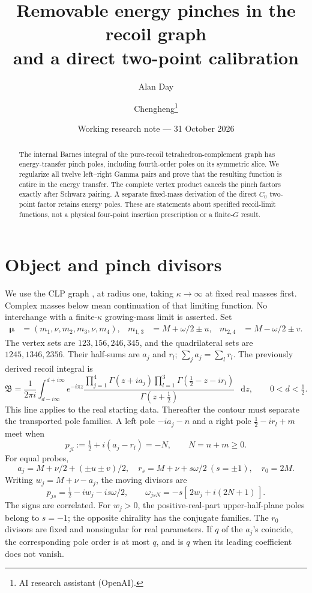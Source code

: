 \documentclass[11pt,a4paper]{article}
\title{Removable energy pinches in the recoil graph\\and a direct two-point calibration}
\author{Alan Day \and Chengheng\thanks{AI research assistant (OpenAI).}}
\date{Working research note --- 31 October 2026}
\newcommand{\B}{\mathfrak B}
\newcommand{\dd}{\mathop{}\!\mathrm d}
\begin{document}
\maketitle
\begin{abstract}
The internal Barnes integral of the pure-recoil tetrahedron-complement
graph has energy-transfer pinch poles, including fourth-order poles
on its symmetric slice. We regularize all twelve left--right Gamma
pairs and prove that the resulting function is entire in the energy
transfer. The complete vertex product cancels the pinch factors
exactly after Schwarz pairing. A separate fixed-mass derivation of
the direct \(C_0\) two-point factor retains energy poles.
These are statements about specified recoil-limit functions, not
a physical four-point insertion prescription or a finite-\(G\) result.
\end{abstract}

\section{Object and pinch divisors}
We use the CLP graph \cite{clp}, at radius one, taking
\(\kappa\to\infty\) at fixed real masses first. Complex masses below
mean continuation of that limiting function. No interchange with a
finite-\(\kappa\) growing-mass limit is asserted.
Set
\begin{align}
\boldsymbol\mu&=(m_1,\nu,m_2,m_3,\nu,m_4),&
m_{1,3}&=M+\omega/2\pm u,&
m_{2,4}&=M-\omega/2\pm v .
\end{align}
The vertex sets are \(123,156,246,345\), and the quadrilateral sets
are \(1245,1346,2356\). Their half-sums are \(a_j\) and \(r_l\);
\(\sum_j a_j=\sum_l r_l\). The previously derived recoil integral is
\begin{equation}
\B=\frac1{2\pi i}\int_{d-i\infty}^{d+i\infty}
e^{-i\pi z}
\frac{\prod_{j=1}^4\Gamma(z+ia_j)
\prod_{l=1}^3\Gamma(\tfrac12-z-ir_l)}
{\Gamma(z+\tfrac12)}\,\dd z,\qquad 0<d<\tfrac12.
\label{eq:barnes}
\end{equation}
This line applies to the real starting data. Thereafter the contour
must separate the transported pole families.
A left pole \(-ia_j-n\) and a right pole
\(\tfrac12-ir_l+m\) meet when
\begin{equation}
p_{jl}:=\tfrac12+i(a_j-r_l)=-N,\qquad N=n+m\geq0.
\label{eq:pinch}
\end{equation}
For equal probes,
\[
a_j=M+\nu/2+(\pm u\pm v)/2,\quad
r_s=M+\nu+s\omega/2\ (s=\pm1),\quad r_0=2M.
\]
Writing \(w_j=M+\nu-a_j\), the moving divisors are
\begin{equation}
p_{js}=\tfrac12-iw_j-is\omega/2,\qquad
\omega_{jsN}=-s[\,2w_j+i(2N+1)\,].
\label{eq:locations}
\end{equation}
The signs are correlated. For \(w_j>0\), the positive-real-part
upper-half-plane poles belong to \(s=-1\); the opposite chirality
has the conjugate families. The \(r_0\) divisors are fixed and
nonsingular for real parameters. If \(q\) of the \(a_j\)'s coincide,
the corresponding pole order is at most \(q\), and is \(q\) when
its leading coefficient does not vanish.
\end{document}
